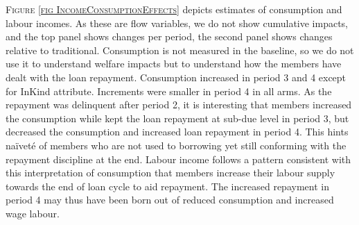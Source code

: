 \begin{figure}
\end{figure}

	\textsc{\footnotesize Figure \ref{fig IncomeConsumptionEffects}} depicts estimates of consumption and labour incomes. As these are flow variables, we do not show cumulative impacts, and the top panel shows changes per period, the second panel shows changes relative to \textsf{traditional}. Consumption is not measured in the baseline, so we do not use it to understand welfare impacts but to understand how the members have dealt with the loan repayment. Consumption increased in period 3 and 4 except for \textsf{InKind} attribute. Increments were smaller in period 4 in all arms. As the repayment was delinquent after period 2, it is interesting that members increased the consumption while kept the loan repayment at sub-due level in period 3, but decreased the consumption and increased loan repayment in period 4. This hints na\"ivet\'e of members who are not used to borrowing yet still conforming with the repayment discipline at the end. Labour income follows a pattern consistent with this interpretation of consumption that members increase their labour supply towards the end of loan cycle to aid repayment. The increased repayment in period 4 may thus have been born out of reduced consumption and increased wage labour.

